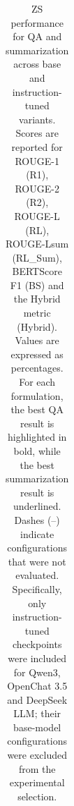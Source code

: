 \begin{table}[ht]
\begin{tabular}{lcccccc|cccccc}
\bottomrule
\end{tabular}
\caption{ZS performance for QA and summarization across base and instruction-tuned variants. Scores are reported for ROUGE-1 (R1), ROUGE-2 (R2), ROUGE-L (RL), ROUGE-Lsum (RL\_Sum), BERTScore F1 (BS) and the Hybrid metric (Hybrid). Values are expressed as percentages. For each formulation, the best QA result is highlighted in bold, while the best summarization result is underlined. Dashes (--) indicate configurations that were not evaluated. Specifically, only instruction-tuned checkpoints were included for Qwen3, OpenChat 3.5 and DeepSeek LLM; their base-model configurations were excluded from the experimental selection.}
\label{tab:results-zs}
\end{table}
